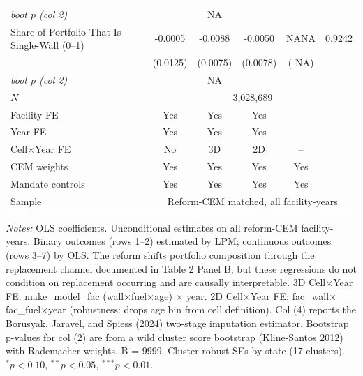 \begin{table}[htbp]
{\begin{tabular}{lccccc}
 \hspace{1em}\textit{boot $p$ (col 2)} & &   NA & \multicolumn{2}{c}{} &  \\[0.3em]
Share of Portfolio That Is Single-Wall (0--1) & -0.0005 & -0.0088 & -0.0050 &    NANA & 0.9242 \\
 & (0.0125) & (0.0075) & (0.0078) & (   NA) &  \\
 \hspace{1em}\textit{boot $p$ (col 2)} & &   NA & \multicolumn{2}{c}{} &  \\[0.3em]
\midrule
$N$ & \multicolumn{5}{c}{3,028,689} \\
Facility FE            & Yes & Yes & Yes & -- & \\
Year FE                & Yes & Yes & Yes & -- & \\
Cell$\times$Year FE   & No  & 3D  & 2D  & -- & \\
CEM weights            & Yes & Yes & Yes & Yes & \\
Mandate controls       & Yes & Yes & Yes & Yes & \\
Sample & \multicolumn{5}{c}{Reform-CEM matched, all facility-years} \\
\bottomrule
\end{tabular}
}
\begin{minipage}{\linewidth}
\small
\textit{Notes:} OLS coefficients. Unconditional estimates on all reform-CEM facility-years. Binary outcomes (rows 1--2) estimated by LPM; continuous outcomes (rows 3--7) by OLS. The reform shifts portfolio composition through the replacement channel documented in Table 2 Panel B, but these regressions do not condition on replacement occurring and are causally interpretable. 3D Cell$\times$Year FE: make\_model\_fac (wall$\times$fuel$\times$age) $\times$ year. 2D Cell$\times$Year FE: fac\_wall$\times$fac\_fuel$\times$year (robustness: drops age bin from cell definition). Col (4) reports the Borusyak, Jaravel, and Spiess (2024) two-stage imputation estimator. Bootstrap p-values for col (2) are from a wild cluster score bootstrap (Kline-Santos 2012) with Rademacher weights, B = 9999. Cluster-robust SEs by state (17 clusters). $^{*}p<0.10$, $^{**}p<0.05$, $^{***}p<0.01$.
\end{minipage}
\end{table}
